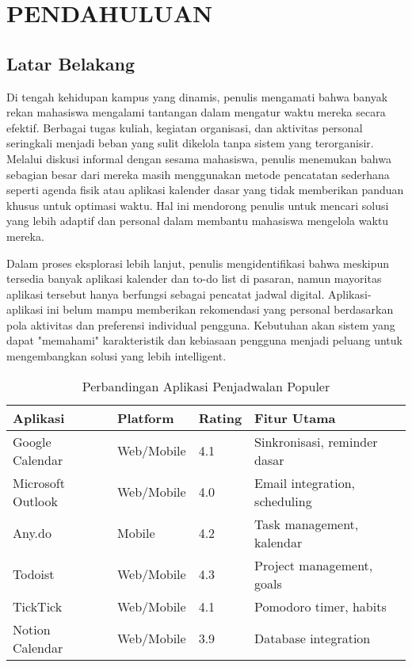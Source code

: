 \chapter{PENDAHULUAN}
\thispagestyle{plain}

\section{Latar Belakang}

Di tengah kehidupan kampus yang dinamis, penulis mengamati bahwa banyak rekan mahasiswa mengalami tantangan dalam mengatur waktu mereka secara efektif. Berbagai tugas kuliah, kegiatan organisasi, dan aktivitas personal seringkali menjadi beban yang sulit dikelola tanpa sistem yang terorganisir. Melalui diskusi informal dengan sesama mahasiswa, penulis menemukan bahwa sebagian besar dari mereka masih menggunakan metode pencatatan sederhana seperti agenda fisik atau aplikasi kalender dasar yang tidak memberikan panduan khusus untuk optimasi waktu. Hal ini mendorong penulis untuk mencari solusi yang lebih adaptif dan personal dalam membantu mahasiswa mengelola waktu mereka.

Dalam proses eksplorasi lebih lanjut, penulis mengidentifikasi bahwa meskipun tersedia banyak aplikasi kalender dan to-do list di pasaran, namun mayoritas aplikasi tersebut hanya berfungsi sebagai pencatat jadwal digital. Aplikasi-aplikasi ini belum mampu memberikan rekomendasi yang personal berdasarkan pola aktivitas dan preferensi individual pengguna. Kebutuhan akan sistem yang dapat "memahami" karakteristik dan kebiasaan pengguna menjadi peluang untuk mengembangkan solusi yang lebih intelligent.

\begin{table}[ht]
\centering
\caption{Perbandingan Aplikasi Penjadwalan Populer}
\label{tab:market-analysis}
\footnotesize
\begin{adjustbox}{width=\textwidth,center}
\begin{tabular}{@{}p{3cm}p{2.5cm}p{2cm}p{4cm}@{}}
\toprule
\textbf{Aplikasi} & \textbf{Platform} & \textbf{Rating} & \textbf{Fitur Utama} \\
\midrule
Google Calendar & Web/Mobile & 4.1 & Sinkronisasi, reminder dasar \\
\hline
Microsoft Outlook & Web/Mobile & 4.0 & Email integration, scheduling \\
\hline
Any.do & Mobile & 4.2 & Task management, kalendar \\
\hline
Todoist & Web/Mobile & 4.3 & Project management, goals \\
\hline
TickTick & Web/Mobile & 4.1 & Pomodoro timer, habits \\
\hline
Notion Calendar & Web/Mobile & 3.9 & Database integration \\
\bottomrule
\end{tabular}
\end{adjustbox}
\end{table}

